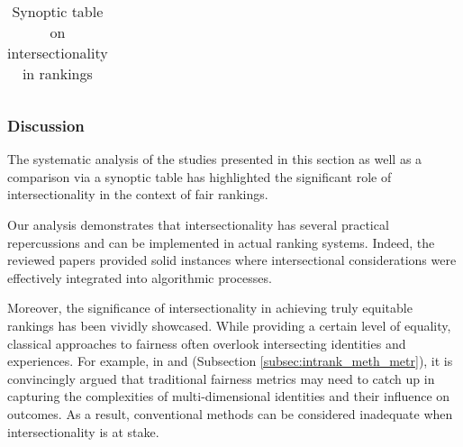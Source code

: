 \begin{landscape}
\begin{longtable}{|p{0.05\linewidth}|p{0.077\linewidth}|p{0.171\linewidth}|p{0.092\linewidth}|p{0.121\linewidth}|p{0.042\linewidth}|p{0.077\linewidth}|p{0.06\linewidth}|p{0.094\linewidth}|p{0.052\linewidth}|}

\caption{Synoptic table on intersectionality in rankings}
\label{tab:synoptic_table} 
\end{longtable}

\egroup
\end{landscape}
\newpage
\normalsize



\subsubsection{Discussion}
\label{subsec:intrank_table_results}

The systematic analysis of the studies presented in this section as well as a comparison via a synoptic table has highlighted the significant role of intersectionality in the context of fair rankings.

Our analysis demonstrates that intersectionality has several practical repercussions and can be implemented in actual 
ranking systems.
Indeed, the reviewed papers provided solid instances where intersectional considerations were effectively integrated into algorithmic processes.

Moreover, the significance of intersectionality in achieving truly equitable rankings has been vividly showcased.
While providing a certain level of equality, classical approaches to fairness often overlook intersecting identities and experiences. For example, in \cite{lum2022biasing} and \cite{wang2022towards} (Subsection \ref{subsec:intrank_meth_metr}), it is convincingly argued that traditional fairness metrics may need to catch up in capturing the complexities of multi-dimensional identities and their influence on outcomes. As a result, conventional methods can be considered inadequate when intersectionality is at stake.

